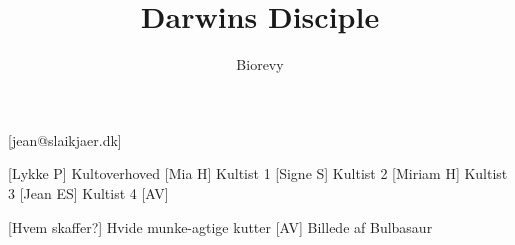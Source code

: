 \documentclass[a4paper,12pt]{article}
\title{Darwins Disciple}
\author{Biorevy}
\begin{document}
\maketitle

\begin{texxers}
	[jean@slaikjaer.dk]
\end{texxers}

\begin{roles}
	[Lykke P] Kultoverhoved
	[Mia H] Kultist 1
	[Signe S] Kultist 2
	[Miriam H] Kultist 3
	[Jean ES] Kultist 4
	[AV]
\end{roles}


\begin{props}
	[Hvem skaffer?] Hvide munke-agtige kutter
	[AV] Billede af Bulbasaur
\end{props}
\end{document}
